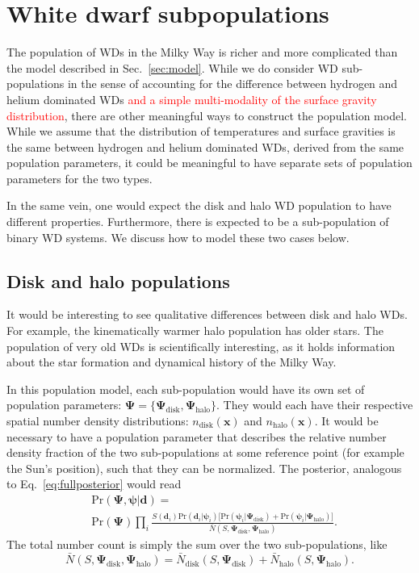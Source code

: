 \documentclass[fleqn,usenatbib]{mnras}
\newcommand{\changes}[1]{\textcolor{red}{#1}}
\newcommand{\popp}{\boldsymbol{\Psi}}
\newcommand{\objp}{\boldsymbol{\psi}}
\newcommand{\data}{\mathbf{d}}
\newcommand{\pr}{\text{Pr}}
\begin{document}
\section{White dwarf subpopulations}\label{sec:subpopulations}

The population of WDs in the Milky Way is richer and more complicated than the model described in Sec.~\ref{sec:model}. While we do consider WD sub-populations in the sense of accounting for the difference between hydrogen and helium dominated WDs \changes{and a simple multi-modality of the surface gravity distribution}, there are other meaningful ways to construct the population model. While we assume that the distribution of temperatures and surface gravities is the same between hydrogen and helium dominated WDs, derived from the same population parameters, it could be meaningful to have separate sets of population parameters for the two types.

In the same vein, one would expect the disk and halo WD population to have different properties. Furthermore, there is expected to be a sub-population of binary WD systems. We discuss how to model these two cases below.



\subsection{Disk and halo populations}

It would be interesting to see qualitative differences between disk and halo WDs. For example, the kinematically warmer halo population has older stars. The population of very old WDs is scientifically interesting, as it holds information about the star formation and dynamical history of the Milky Way.

In this population model, each sub-population would have its own set of population parameters: $\popp = \{ \popp_\text{disk},\popp_\text{halo} \}$. They would each have their respective spatial number density distributions: $n_\text{disk}(\mathbf{x})$ and $n_\text{halo}(\mathbf{x})$. It would be necessary to have a population parameter that describes the relative number density fraction of the two sub-populations at some reference point (for example the Sun's position), such that they can be normalized. The posterior, analogous to Eq.~\eqref{eq:fullposterior} would read
\begin{equation}\label{eq:posterior_disk_halo}
\begin{split}
	& \pr(\popp,\objp | \data ) = \\
	& \pr(\popp)
	\prod_i 
	\frac{S(\data_i) \pr(\data_i | \objp_i)
	\Big[ \pr(\objp_i | \popp_\text{disk})+\pr(\objp_i | \popp_\text{halo}) \Big] }
	{\bar{N}(S,\popp_\text{disk},\popp_\text{halo})}.
\end{split}
\end{equation}
The total number count is simply the sum over the two sub-populations, like
\begin{equation}
	\bar{N}(S,\popp_\text{disk},\popp_\text{halo})=\bar{N}_\text{disk}(S,\popp_\text{disk})+\bar{N}_\text{halo}(S,\popp_\text{halo}).
\end{equation}
\end{document}
